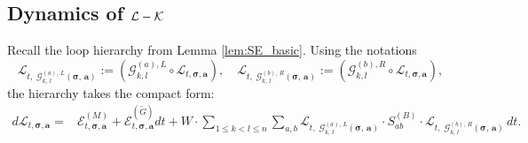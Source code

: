 \documentclass[10pt,reqno]{article}
\theoremstyle{plain} %
\theoremstyle{remark}
\numberwithin{equation}{section}
\begin{document}
\subsection{Dynamics of  \texorpdfstring{$\cal L-\cal K$}{L-K}}

 Recall the loop hierarchy from Lemma \ref{lem:SE_basic}. Using the notations
$$
\mathcal{L}_{t,\;  \mathcal{G}^{(a), \,L}_{k, \,l}\left(\boldsymbol{\sigma},\, \textbf{a}\right)} := \left( \mathcal{G}^{(a), L}_{k, l} \circ \mathcal{L}_{t, \boldsymbol{\sigma}, \textbf{a}} \right), \quad  
\mathcal{L}_{t,\;  \mathcal{G}^{(b), \,R}_{k, \,l}\left(\boldsymbol{\sigma},\, \textbf{a}\right)} := \left( \mathcal{G}^{(b), R}_{k, l} \circ \mathcal{L}_{t, \boldsymbol{\sigma}, \textbf{a}} \right),
$$
the hierarchy takes the compact form:
\begin{align}
    d\mathcal{L}_{t, \boldsymbol{\sigma}, \textbf{a}} =& 
    \mathcal{E}^{(M)}_{t, \boldsymbol{\sigma}, \textbf{a}} +
    \mathcal{E}^{(\widetilde{G})}_{t, \boldsymbol{\sigma}, \textbf{a}}dt +
    W\cdot\sum_{1 \leq k < l \leq n} \sum_{a, b} \mathcal{L}_{t,\;  \mathcal{G}^{(a), \,L}_{k, \,l}\left(\boldsymbol{\sigma},\, \textbf{a}\right)} \cdot  S^{(B)}_{ab} \cdot \mathcal{L}_{t,\;  \mathcal{G}^{(b), \,R}_{k, \,l}\left(\boldsymbol{\sigma},\, \textbf{a}\right)}  \, dt.
\end{align}
\end{document}
